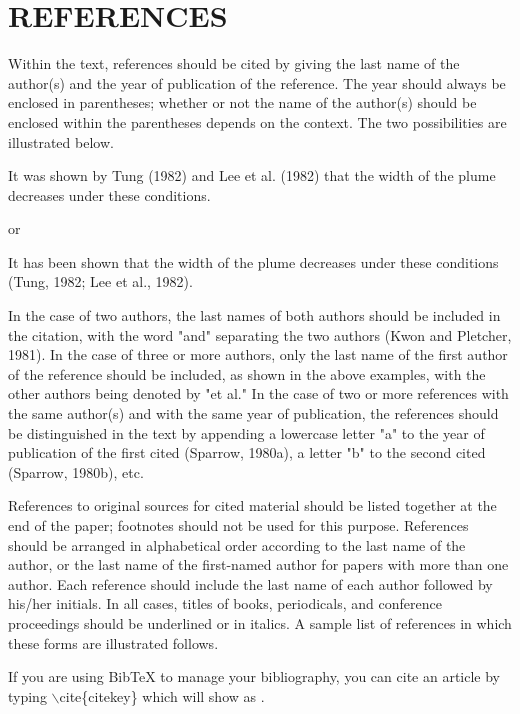 \documentclass[twocolumn,10pt]{hphrc}
\begin{document}
\section*{REFERENCES}

Within the text, references should be cited by giving the last name of the author(s) and the year of publication of the reference. The year should always be enclosed in parentheses; whether or not the name of the author(s) should be enclosed within the parentheses depends on the context. The two possibilities are illustrated below.

It was shown by Tung (1982) and Lee et al. (1982) that the width of the plume decreases under these conditions.

or

It has been shown that the width of the plume decreases under these conditions (Tung, 1982; Lee et al., 1982).

In the case of two authors, the last names of both authors should be included in the citation, with the word "and" separating the two authors (Kwon and Pletcher, 1981). In the case of three or more authors, only the last name of the first author of the reference should be included, as shown in the above examples, with the other authors being denoted by "et al." In the case of two or more references with the same author(s) and with the same year of publication, the references should be distinguished in the text by appending a lowercase letter "a" to the year of publication of the first cited (Sparrow, 1980a), a letter "b" to the second cited (Sparrow, 1980b), etc.

References to original sources for cited material should be listed together at the end of the paper; footnotes should not be used for this purpose. References should be arranged in alphabetical order according to the last name of the author, or the last name of the first-named author for papers with more than one author. Each reference should include the last name of each author followed by his/her initials. In all cases, titles of books, periodicals, and conference proceedings should be underlined or in italics. A sample list of references in which these forms are illustrated follows.

If you are using BibTeX to manage your bibliography, you can cite an article by typing $\backslash$cite\{citekey\} which will show as \cite{Lee}. \nocite{Kwon} \nocite{Sparrow2} \nocite{Sparrow} \nocite{Tung}
\end{document}
